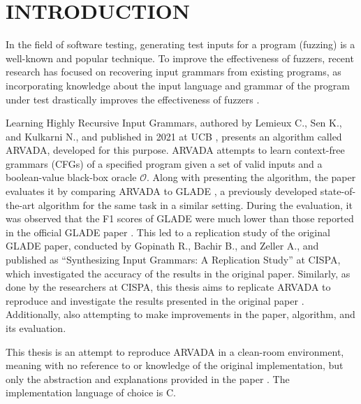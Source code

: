 \chapter{INTRODUCTION}

In the field of software testing, generating test inputs for a program (fuzzing) is a well-known and popular technique. To improve the effectiveness of fuzzers, recent research has focused on recovering input grammars from existing programs, as incorporating knowledge about the input language and grammar of the program under test drastically improves the effectiveness of fuzzers \cite{gopinathBuildingFastFuzzers2019}.

\vspace{\baselineskip}
Learning Highly Recursive Input Grammars, authored by Lemieux C., Sen K., and Kulkarni N., and published in 2021 at UCB \cite{kulkarniLearningHighlyRecursive2021}, presents an algorithm called ARVADA, developed for this purpose. ARVADA attempts to learn context-free grammars (CFGs) of a specified program given a set of valid inputs and a boolean-value black-box oracle $\mathcal{O}$. Along with presenting the algorithm, the paper evaluates it by comparing ARVADA to GLADE \cite{bastaniSynthesizingProgramInput}, a previously developed state-of-the-art algorithm for the same task in a similar setting.
During the evaluation, it was observed that the F1 scores of GLADE were much lower than those reported in the official GLADE paper \cite{bastaniSynthesizingProgramInput}. This led to a replication study of the original GLADE paper, conducted by Gopinath R., Bachir B., and Zeller A., and published as “Synthesizing Input Grammars: A Replication Study” \cite{bendrissouSynthesizingInputGrammars2022} at CISPA, which investigated the accuracy of the results in the original paper. Similarly, as done by the researchers at CISPA, this thesis aims to replicate ARVADA to reproduce and investigate the results presented in the original paper \cite{kulkarniLearningHighlyRecursive2021}. Additionally, also attempting to make improvements in the paper, algorithm, and its evaluation.

\vspace{\baselineskip}
This thesis is an attempt to reproduce ARVADA in a clean-room environment, meaning with no reference to or knowledge of the original implementation, but only the abstraction and explanations provided in the paper \cite{kulkarniLearningHighlyRecursive2021}. The implementation language of choice is C.

